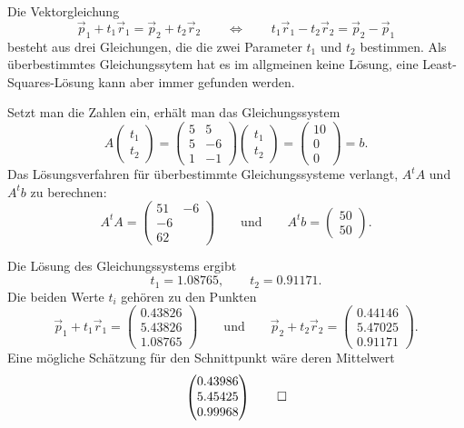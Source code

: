 \begin{loesung}
\begin{teilaufgaben}
\item
Die Vektorgleichung
\[
\vec p_1+t_1\vec r_1 = \vec p_2 + t_2\vec r_2
\qquad\Leftrightarrow\qquad
t_1\vec r_1 - t_2\vec r_2 = \vec p_2 -\vec p_1
\]
besteht aus drei Gleichungen, die die zwei Parameter $t_1$ und $t_2$ 
bestimmen. 
Als überbestimmtes Gleichungssytem hat es im allgmeinen keine
Lösung, eine Least-Squares-Lösung kann aber immer gefunden werden.

Setzt man die Zahlen ein, erhält man das Gleichungssystem
\[
A
\begin{pmatrix}
t_1\\t_2
\end{pmatrix}
=
\begin{pmatrix}
5& 5\\
5&-6\\
1&-1
\end{pmatrix}
\begin{pmatrix}
t_1\\t_2
\end{pmatrix}
=
\begin{pmatrix}
10\\0\\0
\end{pmatrix}
=
b.
\]
Das Lösungsverfahren für überbestimmte Gleichungssysteme verlangt,
$A^tA$ und $A^tb$ zu berechnen:
\[
A^tA=\begin{pmatrix}51&-6\\-6\\62\end{pmatrix}
\qquad\text{und}\qquad
A^tb=\begin{pmatrix}50\\50\end{pmatrix}.
\]
\item
Die Lösung des Gleichungssystems ergibt
\[
t_1 = 1.08765,
\qquad
t_2 = 0.91171.
\]
Die beiden Werte $t_i$ gehören zu den Punkten
\[
\vec p_1+t_1\vec r_1
=
\begin{pmatrix}
   0.43826\\
   5.43826\\
   1.08765
\end{pmatrix}
\qquad\text{und}\qquad
\vec p_2+t_2\vec r_2
=
\begin{pmatrix}
   0.44146\\
   5.47025\\
   0.91171
\end{pmatrix}.
\]
Eine mögliche Schätzung für den Schnittpunkt wäre deren Mittelwert
\begin{equation}
\begin{pmatrix}
   0.43986\\
   5.45425\\
   0.99968
\end{pmatrix}
\label{40000044:loes}
\qedhere
\end{equation}
\end{teilaufgaben}
\end{loesung}

